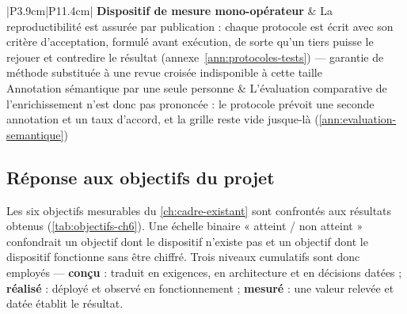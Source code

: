\begin{table}[!htbp]
\begin{tabular}{|P{3.9cm}|P{11.4cm}|}
\textbf{Dispositif de mesure mono-opérateur} & La reproductibilité est assurée par publication :
chaque protocole est écrit avec son critère d'acceptation, formulé avant exécution, de sorte qu'un
tiers puisse le rejouer et contredire le résultat (annexe~\ref{ann:protocoles-tests}) --- garantie
de méthode substituée à une revue croisée indisponible à cette taille \\ \hline
Annotation sémantique par une seule personne & L'évaluation comparative de l'enrichissement n'est
donc pas prononcée : le protocole prévoit une seconde annotation et un taux d'accord, et la grille
reste vide jusque-là (\cref{ann:evaluation-semantique}) \\
\hline
\end{tabular}
\end{table}

\subsection{Réponse aux objectifs du projet}

Les six objectifs mesurables du \cref{ch:cadre-existant} sont confrontés aux résultats obtenus
(\cref{tab:objectifs-ch6}). Une échelle binaire « atteint / non atteint » confondrait un objectif
dont le dispositif n'existe pas et un objectif dont le dispositif fonctionne sans être chiffré.
Trois niveaux cumulatifs sont donc employés --- \textbf{conçu} : traduit en exigences, en
architecture et en décisions datées ; \textbf{réalisé} : déployé et observé en fonctionnement ;
\textbf{mesuré} : une valeur relevée et datée établit le résultat.

